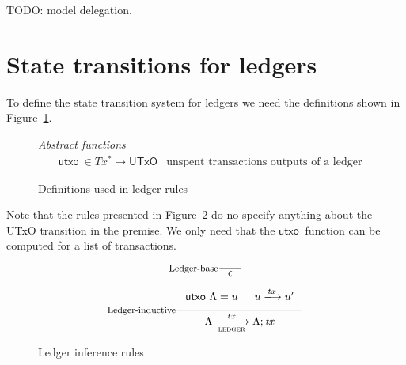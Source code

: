 \documentclass[11pt,a4paper]{article}
\newcommand{\var}[1]{\mathit{#1}}
\newcommand{\fun}[1]{\mathsf{#1}}
\newcommand{\type}[1]{\mathsf{#1}}
\newcommand{\trans}[2]{\xlongrightarrow[\textsc{#1}]{#2}}
\newcommand{\seqof}[1]{#1^{*}}
\newcommand{\UTxO}{\type{UTxO}}
\newcommand{\utxo}[1]{\fun{utxo}\ #1}
\begin{document}
TODO: model delegation.

\section{State transitions for ledgers}
\label{sec:state-trans-ledg}

To define the state transition system for ledgers we need the definitions
shown in Figure~\ref{fig:ledger-rules-defs}.

\begin{figure}[h]
  \emph{Abstract functions}
  \begin{align*}
    & \utxo{} \in \seqof{Tx} \mapsto \UTxO
      & \text{unspent transactions outputs of a ledger}
  \end{align*}
  \caption{Definitions used in ledger rules}
  \label{fig:ledger-rules-defs}
\end{figure}

Note that the rules presented in Figure~\ref{fig:ledger-rules} do no specify
anything about the UTxO transition in the premise. We only need that the
$\utxo{}$ function can be computed for a list of transactions.

\begin{figure}[h]
  \begin{equation}
    \label{eq:ledger-base}
    \inference[Ledger-base]
    {}
    {\epsilon}
  \end{equation}

  \begin{equation}
    \label{eq:ledger-indutive}
    \inference[Ledger-inductive]
    {\utxo{\Lambda} = u & u \trans{}{tx} u' }
    {\Lambda \trans{ledger}{tx}{\Lambda; \var{tx}}}
  \end{equation}
  \caption{Ledger inference rules}
  \label{fig:ledger-rules}
\end{figure}
\end{document}
